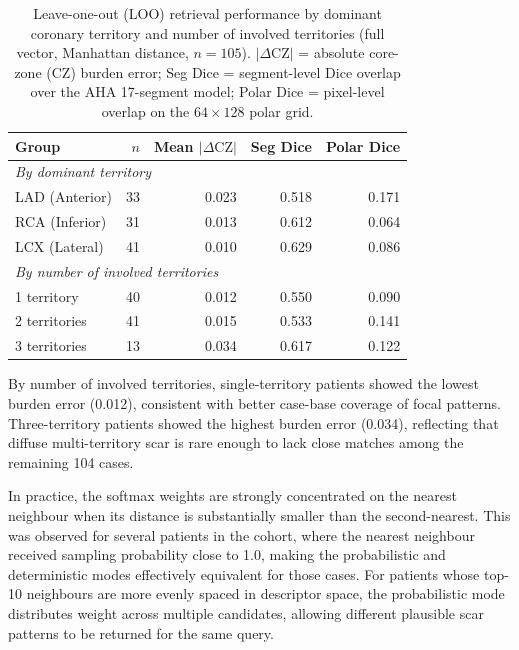 \begin{table}[htbp]
    \centering
    \caption{Leave-one-out (LOO) retrieval performance by dominant coronary territory and number of involved
    territories (full vector, Manhattan distance, $n=105$). $|\Delta\text{CZ}|$ = absolute core-zone (CZ) burden error;
    Seg Dice = segment-level Dice overlap over the AHA 17-segment model;
    Polar Dice = pixel-level overlap on the $64\times128$ polar grid.}
    \label{tab:terrperf}
    \small
    \begin{tabular}{lrrrr}
        \toprule
        Group & $n$ & Mean $|\Delta\text{CZ}|$ & Seg Dice & Polar Dice \\
        \midrule
        \multicolumn{5}{l}{\textit{By dominant territory}} \\
        LAD (Anterior) & 33 & 0.023 & 0.518 & 0.171 \\
        RCA (Inferior) & 31 & 0.013 & 0.612 & 0.064 \\
        LCX (Lateral)  & 41 & 0.010 & 0.629 & 0.086 \\
        \midrule
        \multicolumn{5}{l}{\textit{By number of involved territories}} \\
        1 territory & 40 & 0.012 & 0.550 & 0.090 \\
        2 territories & 41 & 0.015 & 0.533 & 0.141 \\
        3 territories & 13 & 0.034 & 0.617 & 0.122 \\
        \bottomrule
    \end{tabular}
\end{table}

By number of involved territories, single-territory patients showed the lowest burden error
(0.012), consistent with better case-base coverage of focal patterns. Three-territory patients
showed the highest burden error (0.034), reflecting that diffuse multi-territory scar is rare
enough to lack close matches among the remaining 104 cases.

In practice, the softmax weights are strongly concentrated on the nearest neighbour when its
distance is substantially smaller than the second-nearest. This was observed for several
patients in the cohort, where the nearest neighbour received sampling probability close to
1.0, making the probabilistic and deterministic modes effectively equivalent for those cases.
For patients whose top-10 neighbours are more evenly spaced in descriptor space, the
probabilistic mode distributes weight across multiple candidates, allowing different plausible
scar patterns to be returned for the same query.

